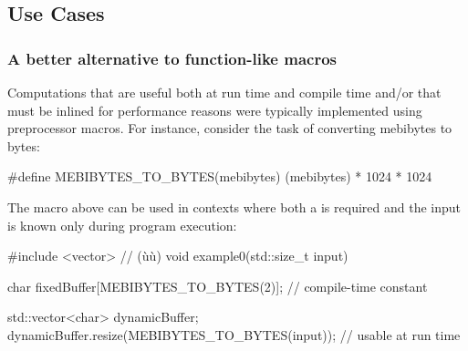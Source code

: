 \subsection[Use Cases]{Use Cases}\label{use-cases}

\subsubsection[A better alternative to function-like macros]{A better alternative to function-like macros}\label{a-better-alternative-to-function-like-macros}

Computations that are useful both at run time and compile time and/or
that must be inlined for performance reasons were typically implemented
using preprocessor macros. For instance, consider the task of converting
mebibytes to bytes:

\begin{emcppslisting}[emcppsbatch=e11]
#define MEBIBYTES_TO_BYTES(mebibytes) (mebibytes) * 1024 * 1024
\end{emcppslisting}
    

\noindent The macro above can be used in contexts where both a  is required and the input is known only during program
execution:

\begin{emcppslisting}[emcppsbatch=e11]
#include <vector>  // (ù{}ù)
void example0(std::size_t input)
{
    char fixedBuffer[MEBIBYTES_TO_BYTES(2)];  // compile-time constant

    std::vector<char> dynamicBuffer;
    dynamicBuffer.resize(MEBIBYTES_TO_BYTES(input));  // usable at run time
}
\end{emcppslisting}
    

